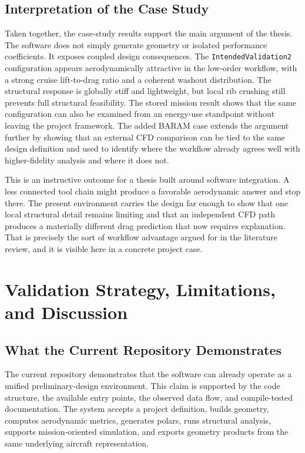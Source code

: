 \documentclass[12pt]{report}
\begin{document}
\section{Interpretation of the Case Study}
Taken together, the case-study results support the main argument of the thesis. The software does not simply generate geometry or isolated performance coefficients. It exposes coupled design consequences. The \texttt{IntendedValidation2} configuration appears aerodynamically attractive in the low-order workflow, with a strong cruise lift-to-drag ratio and a coherent washout distribution. The structural response is globally stiff and lightweight, but local rib crushing still prevents full structural feasibility. The stored mission result shows that the same configuration can also be examined from an energy-use standpoint without leaving the project framework. The added BARAM case extends the argument further by showing that an external CFD comparison can be tied to the same design definition and used to identify where the workflow already agrees well with higher-fidelity analysis and where it does not.

This is an instructive outcome for a thesis built around software integration. A less connected tool chain might produce a favorable aerodynamic answer and stop there. The present environment carries the design far enough to show that one local structural detail remains limiting and that an independent CFD path produces a materially different drag prediction that now requires explanation. That is precisely the sort of workflow advantage argued for in the literature review, and it is visible here in a concrete project case.

\chapter{Validation Strategy, Limitations, and Discussion}
\section{What the Current Repository Demonstrates}
The current repository demonstrates that the software can already operate as a unified preliminary-design environment. This claim is supported by the code structure, the available entry points, the observed data flow, and compile-tested documentation. The system accepts a project definition, builds geometry, computes aerodynamic metrics, generates polars, runs structural analysis, supports mission-oriented simulation, and exports geometry products from the same underlying aircraft representation.
\end{document}
